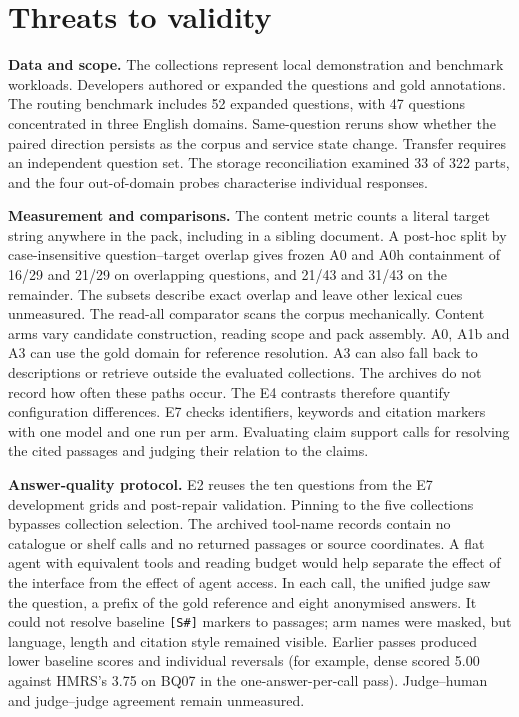 \section{Threats to validity}
\label{sec:threats}

\noindent\textbf{Data and scope.} The collections represent local
demonstration and benchmark workloads. Developers authored or expanded the
questions and gold annotations. The routing benchmark includes 52 expanded
questions, with 47 questions concentrated in three English domains.
Same-question reruns show whether the paired direction persists as the
corpus and service state change. Transfer requires an independent question
set. The storage reconciliation examined 33 of 322 parts, and the four
out-of-domain probes characterise individual responses.

\noindent\textbf{Measurement and comparisons.} The content metric counts a
literal target string anywhere in the pack, including in a sibling
document. A post-hoc split by case-insensitive question--target overlap
gives frozen A0 and A0h containment of
16/29 and 21/29 on overlapping questions, and 21/43 and 31/43 on the
remainder. The subsets describe exact overlap and leave other lexical
cues unmeasured. The read-all comparator scans the corpus mechanically.
Content arms vary candidate construction, reading scope and pack assembly.
A0, A1b and A3 can use the gold domain for reference resolution. A3 can
also fall back to descriptions or retrieve outside the evaluated collections.
The archives do not record how often these paths occur. The E4 contrasts
therefore quantify configuration differences. E7 checks identifiers,
keywords and citation markers with one model and one run per arm.
Evaluating claim support calls for resolving the cited passages and judging
their relation to the claims.

\noindent\textbf{Answer-quality protocol.} E2 reuses the ten questions from
the E7 development grids and post-repair validation. Pinning to the five
collections bypasses collection selection. The archived tool-name records
contain no catalogue or shelf calls and no returned passages or source
coordinates. A flat agent with equivalent tools and reading budget would
help separate the effect of the interface from the effect of agent access.
In each call, the unified judge saw the question, a prefix of the gold
reference and eight anonymised answers. It could not resolve baseline
\texttt{[S\#]} markers to passages; arm names were masked, but language,
length and citation style remained visible. Earlier passes produced lower
baseline scores and individual reversals (for example, dense scored 5.00
against HMRS's 3.75 on BQ07 in the one-answer-per-call pass). Judge--human
and judge--judge agreement remain unmeasured.

